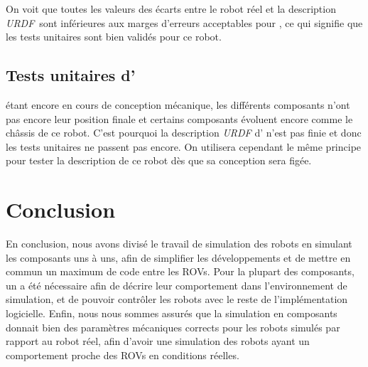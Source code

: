 			On voit que toutes les valeurs des écarts entre le robot réel et la description \textit{URDF} sont inférieures aux marges d'erreurs acceptables pour \argos{}, ce qui signifie que les tests unitaires sont bien validés pour ce robot.

		\subsection{Tests unitaires d'\atoll{}}

			\atoll{} étant encore en cours de conception mécanique, les différents composants n'ont pas encore leur position finale et certains composants évoluent encore comme le châssis de ce robot. C'est pourquoi la description \textit{URDF} d'\atoll{} n'est pas finie et donc les tests unitaires ne passent pas encore. On utilisera cependant le même principe pour tester la description de ce robot dès que sa conception sera figée.
			
	\section{Conclusion}
	
		En conclusion, nous avons divisé le travail de simulation des robots en simulant les composants uns à uns, afin de simplifier les développements et de mettre en commun un maximum de code entre les \gls{ROV}s. Pour la plupart des composants, un \plugin{} \gazebo{} a été nécessaire afin de décrire leur comportement dans l'environnement de simulation, et de pouvoir contrôler les robots avec le reste de l'implémentation logicielle. Enfin, nous nous sommes assurés que la simulation en composants donnait bien des paramètres mécaniques corrects pour les robots simulés par rapport au robot réel, afin d'avoir une simulation des robots ayant un comportement proche des \gls{ROV}s en conditions réelles.
